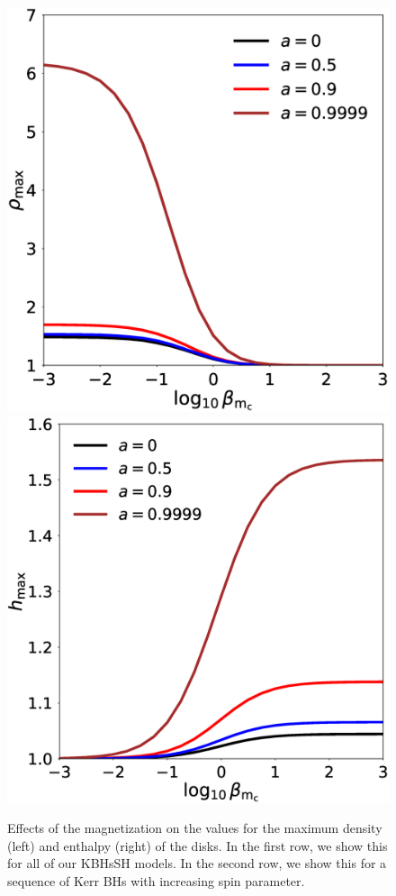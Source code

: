 \documentclass[twocolumn,aps,showpacs,showkeys,prd,superscriptaddress,byrevtex, amsmath]{revtex4-1}
\begin{document}
\begin{figure}
\hspace{-0.cm}
\\
\includegraphics[scale=0.2]{figures/fig7_Kerr_dens.eps}
\hspace{-0.cm}
\includegraphics[scale=0.2]{figures/fig7_Kerr_enth.eps}
\hspace{-0.cm}
\caption{Effects of the magnetization on the values for the maximum density (left) and enthalpy (right) of the disks. In the first row, we show this for all of our KBHsSH models. In the second row, we show this for a sequence of Kerr BHs with increasing spin parameter.}
\label{comparison_HBH_Kerr_dens_enth}
\end{figure}
\end{document}
